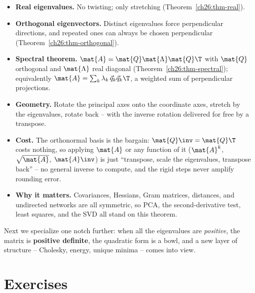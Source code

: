 \begin{itemize}
  \item \textbf{Real eigenvalues.} No twisting; only stretching
        (Theorem~\ref{ch26:thm-real}).
  \item \textbf{Orthogonal eigenvectors.} Distinct eigenvalues force perpendicular
        directions, and repeated ones can always be chosen perpendicular
        (Theorem~\ref{ch26:thm-orthogonal}).
  \item \textbf{Spectral theorem.} $\mat{A}=\mat{Q}\mat{\Lambda}\mat{Q}\T$ with
        $\mat{Q}$ orthogonal and $\mat{\Lambda}$ real diagonal
        (Theorem~\ref{ch26:thm-spectral}); equivalently
        $\mat{A}=\sum_k \lambda_k\,\vec{q}_k\vec{q}_k\T$, a weighted sum of
        perpendicular projections.
  \item \textbf{Geometry.} Rotate the principal axes onto the coordinate axes,
        stretch by the eigenvalues, rotate back -- with the inverse rotation
        delivered for free by a transpose.
  \item \textbf{Cost.} The orthonormal basis is the bargain: $\mat{Q}\inv=\mat{Q}\T$
        costs nothing, so applying $\mat{A}$ or any function of it
        ($\mat{A}^k$, $\sqrt{\mat{A}}$, $\mat{A}\inv$) is just ``transpose, scale
        the eigenvalues, transpose back'' -- no general inverse to compute, and the
        rigid steps never amplify rounding error.
  \item \textbf{Why it matters.} Covariances, Hessians, Gram matrices, distances,
        and undirected networks are all symmetric, so PCA, the second-derivative
        test, least squares, and the SVD all stand on this theorem.
\end{itemize}

Next we specialize one notch further: when all the eigenvalues are \emph{positive},
the matrix is \textbf{positive definite}, the quadratic form is a bowl, and a new
layer of structure -- Cholesky, energy, unique minima -- comes into view.

\section{Exercises}
\label{ch26:exercises}

